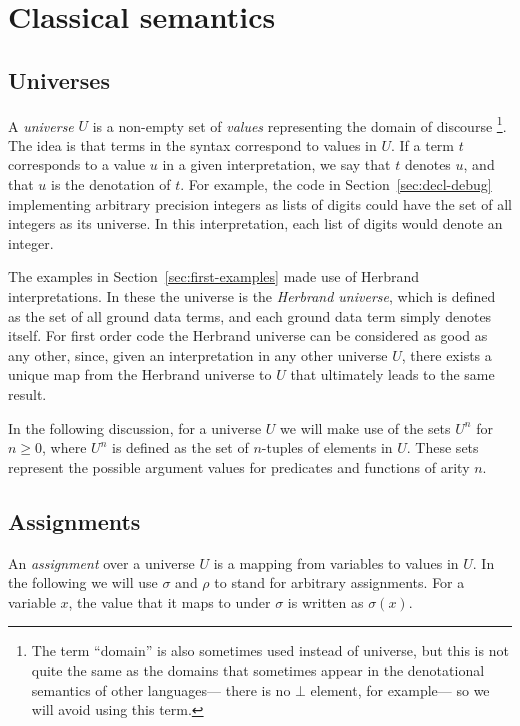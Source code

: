 \section{Classical semantics}
\label{sec:classical}

\subsection{Universes}

A \emph{universe} $U$ is a non-empty set of \emph{values\label{gi:value}}
representing the domain of discourse%
\footnote{
The term ``domain'' is also sometimes used instead of universe,
but this is not quite the same as the domains that sometimes appear
in the denotational semantics of other languages---%
there is no $\bot$ element, for example---%
so we will avoid using this term.
}.
The idea is that terms in the syntax
correspond to values in $U$.
If a term $t$ corresponds to a value $u$
in a given interpretation,
we say that $t$ denotes $u$,
and that $u$ is the denotation of $t$.
For example,
the code in Section~\ref{sec:decl-debug}
implementing arbitrary precision integers as lists of digits
could have the set of all integers as its universe.
In this interpretation,
each list of digits would denote an integer.

The examples in Section~\ref{sec:first-examples}
made use of Herbrand interpretations.
In these the universe is the
\emph{Herbrand universe\label{gi:herbrand-universe}},
which is defined as the set of all ground data terms,
and each ground data term simply denotes itself.
For first order code
the Herbrand universe can be considered as good as any other,
since, given an interpretation in any other universe $U$,
there exists a unique map
from the Herbrand universe to $U$
that ultimately leads to the same result.

In the following discussion,
for a universe $U$
we will make use of the sets $U^n$ for $n \geqslant 0$,
where $U^n$ is defined as the set of $n$-tuples of elements in $U$.
These sets represent the possible argument values
for predicates and functions of arity $n$.


\subsection{Assignments}
\label{sec:assignments}

An \emph{assignment} over a universe $U$
is a mapping from variables to values in $U$.
In the following
we will use $\sigma$ and $\rho$ to stand for arbitrary assignments.
For a variable $x$,
the value that it maps to under $\sigma$ is written as $\sigma(x)$.

